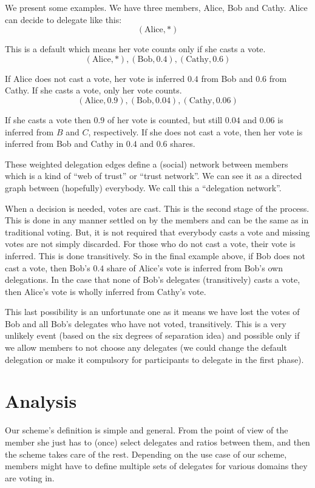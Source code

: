 \documentclass[a4paper]{acm_proc_article-sp}
\begin{document}
We present some examples. We have three members, Alice, Bob and Cathy. Alice can decide to delegate like this:
$$(\mathrm{Alice}, *)$$

This is a default which means her vote counts only if she casts a vote.
$$(\mathrm{Alice}, *), (\mathrm{Bob}, 0.4), (\mathrm{Cathy}, 0.6)$$

If Alice does not cast a vote, her vote is inferred $0.4$ from Bob and $0.6$ from Cathy. If she casts a vote, only her
vote counts.
$$(\mathrm{Alice}, 0.9), (\mathrm{Bob}, 0.04), (\mathrm{Cathy}, 0.06)$$

If she casts a vote then $0.9$ of her vote is counted, but still $0.04$ and $0.06$ is inferred from $B$ and $C$, respectively.
If she does not cast a vote, then her vote is inferred from Bob and Cathy in $0.4$ and $0.6$ shares.

These weighted delegation edges define a (social) network between members which is a kind of ``web of trust'' or
``trust network''. We can see it as a directed graph between (hopefully) everybody. We call this a ``delegation network''.

When a decision is needed, votes are cast. This is the second stage of the process. This is done in any manner settled on by the members and can be the same as in traditional voting. But, it is not required that everybody casts a vote and missing votes are not
simply discarded. For those who do not cast a vote, their vote is inferred. This is done transitively. So in the final example
above, if Bob does not cast a vote, then Bob's $0.4$ share of Alice's vote is inferred from Bob's own delegations. In the
case that none of Bob's delegates (transitively) casts a vote, then Alice's vote is wholly inferred from Cathy's vote.

This last possibility is an unfortunate one as it means we have lost the votes of Bob and all Bob's delegates who have not
voted, transitively. This is a very unlikely event (based on the six degrees of separation idea) and possible only if we allow
members to not choose any delegates (we could change the default delegation or make it compulsory for participants to delegate in the first phase).

\section{Analysis}

Our scheme's definition is simple and general. From the point of view of the member she just has to (once) select delegates and ratios
between them, and then the scheme takes care of the rest. Depending on the use case of our scheme, members might have to define
multiple sets of delegates for various domains they are voting in.
\end{document}
